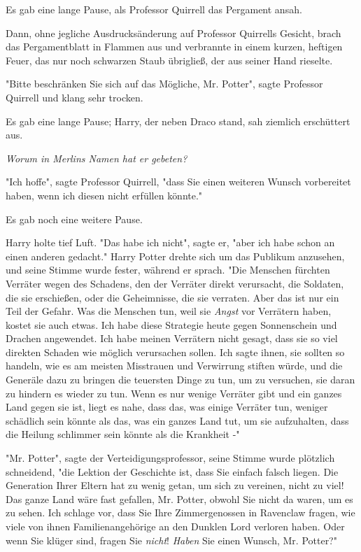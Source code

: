 {Es gab eine lange Pause, als Professor Quirrell das Pergament ansah.

Dann, ohne jegliche Ausdrucksänderung auf Professor Quirrells Gesicht, brach das Pergamentblatt in Flammen aus und verbrannte in einem kurzen, heftigen Feuer, das nur noch schwarzen Staub übrigließ, der aus seiner Hand rieselte.

"Bitte beschränken Sie sich auf das Mögliche, Mr. Potter", sagte Professor Quirrell und klang sehr trocken.

Es gab eine lange Pause; Harry, der neben Draco stand, sah ziemlich erschüttert aus.

\emph{\emph{Worum in Merlins Namen hat er gebeten?}}

"Ich hoffe", sagte Professor Quirrell, "dass Sie einen weiteren Wunsch vorbereitet haben, wenn ich diesen nicht erfüllen könnte."

Es gab noch eine weitere Pause.

Harry holte tief Luft. "Das habe ich nicht", sagte er, "aber ich habe schon an einen anderen gedacht." Harry Potter drehte sich um das Publikum anzusehen, und seine Stimme wurde fester, während er sprach. "Die Menschen fürchten Verräter wegen des Schadens, den der Verräter direkt verursacht, die Soldaten, die sie erschießen, oder die Geheimnisse, die sie verraten. Aber das ist nur ein Teil der Gefahr. Was die Menschen tun, weil sie \emph{Angst} vor Verrätern haben, kostet sie auch etwas. Ich habe diese Strategie heute gegen Sonnenschein und Drachen angewendet. Ich habe meinen Verrätern nicht gesagt, dass sie so viel direkten Schaden wie möglich verursachen sollen. Ich sagte ihnen, sie sollten so handeln, wie es am meisten Misstrauen und Verwirrung stiften würde, und die Generäle dazu zu bringen die teuersten Dinge zu tun, um zu versuchen, sie daran zu hindern es wieder zu tun. Wenn es nur wenige Verräter gibt und ein ganzes Land gegen sie ist, liegt es nahe, dass das, was einige Verräter tun, weniger schädlich sein könnte als das, was ein ganzes Land tut, um sie aufzuhalten, dass die Heilung schlimmer sein könnte als die Krankheit -"

"Mr. Potter", sagte der Verteidigungsprofessor, seine Stimme wurde plötzlich schneidend, "die Lektion der Geschichte ist, dass Sie einfach falsch liegen. Die Generation Ihrer Eltern hat zu wenig getan, um sich zu vereinen, nicht zu viel! Das ganze Land wäre fast gefallen, Mr. Potter, obwohl Sie nicht da waren, um es zu sehen. Ich schlage vor, dass Sie Ihre Zimmergenossen in Ravenclaw fragen, wie viele von ihnen Familienangehörige an den Dunklen Lord verloren haben. Oder wenn Sie klüger sind, fragen Sie \emph{nicht}! \emph{Haben} Sie einen Wunsch, Mr. Potter?"

}
